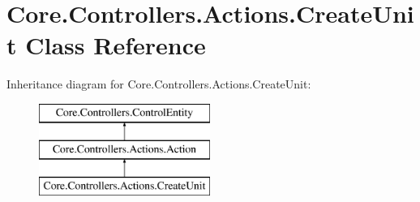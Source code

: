 \hypertarget{classCore_1_1Controllers_1_1Actions_1_1CreateUnit}{\section{Core.\-Controllers.\-Actions.\-Create\-Unit Class Reference}
\label{classCore_1_1Controllers_1_1Actions_1_1CreateUnit}
}
Inheritance diagram for Core.\-Controllers.\-Actions.\-Create\-Unit\-:\begin{figure}[H]
\begin{center}
\leavevmode
\includegraphics[height=3.000000cm]{classCore_1_1Controllers_1_1Actions_1_1CreateUnit}
\end{center}
\end{figure}
